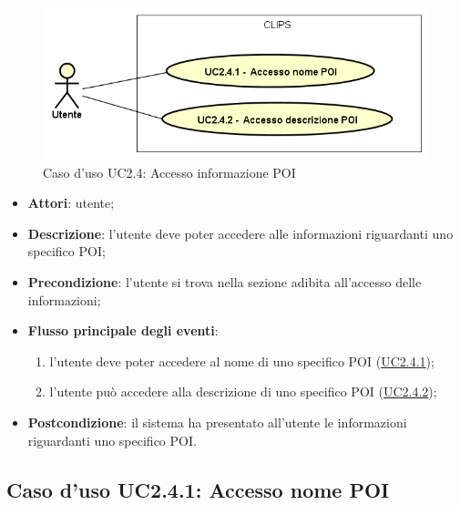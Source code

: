 \documentclass[../AnalisiDeiRequisiti.tex]{subfiles}
\begin{document}
        \begin{figure}[!h]
            \centering
            \includegraphics[scale=0.95, width=\textwidth]{img/UC2-4.png}
            \caption{Caso d'uso UC2.4: Accesso informazione POI}\label{fig:UC2.4} 
        \end{figure}
\begin{itemize}
\item \textbf{Attori}: utente;
\item \textbf{Descrizione}: l'utente deve poter accedere alle informazioni riguardanti uno specifico POI; 
      \item \textbf{Precondizione}: l'utente si trova nella sezione adibita all'accesso delle informazioni;

        \item \textbf{Flusso principale degli eventi}:
          \begin{enumerate}
          \item l'utente deve poter accedere al nome di uno specifico POI (\hyperlink{UC2.4.1}{UC2.4.1});
          \item l'utente può accedere alla descrizione di uno specifico POI (\hyperlink{UC2.4.2}{UC2.4.2});

      \end{enumerate}
    \item \textbf{Postcondizione}: il sistema ha presentato all'utente le informazioni riguardanti uno specifico POI.
  \end{itemize}
\hypertarget{UC2.4.1}{}
\subsection{Caso d'uso UC2.4.1: Accesso nome POI}
\end{document}
